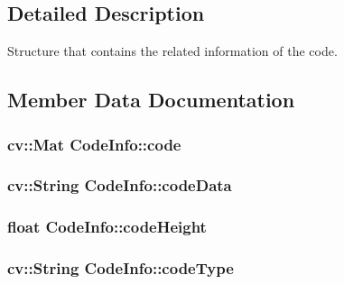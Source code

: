 \subsection{Detailed Description}
Structure that contains the related information of the code. 

\subsection{Member Data Documentation}
\subsubsection[{\texorpdfstring{code}{code}}]{\setlength{\rightskip}{0pt plus 5cm}cv\+::\+Mat Code\+Info\+::code}\hypertarget{struct_code_info_aeaec8d442ba7cf5b8a946f3da849ebfe}{}\label{struct_code_info_aeaec8d442ba7cf5b8a946f3da849ebfe}
\subsubsection[{\texorpdfstring{code\+Data}{codeData}}]{\setlength{\rightskip}{0pt plus 5cm}cv\+::\+String Code\+Info\+::code\+Data}\hypertarget{struct_code_info_a01341cc7b99f93fbdd052f6d3e5b1e20}{}\label{struct_code_info_a01341cc7b99f93fbdd052f6d3e5b1e20}
\subsubsection[{\texorpdfstring{code\+Height}{codeHeight}}]{\setlength{\rightskip}{0pt plus 5cm}float Code\+Info\+::code\+Height}\hypertarget{struct_code_info_a8035a0d0891b25d59693e23f192e3a29}{}\label{struct_code_info_a8035a0d0891b25d59693e23f192e3a29}
\subsubsection[{\texorpdfstring{code\+Type}{codeType}}]{\setlength{\rightskip}{0pt plus 5cm}cv\+::\+String Code\+Info\+::code\+Type}\hypertarget{struct_code_info_aa93c41fefb9505ee55963d60ec1299e7}{}\label{struct_code_info_aa93c41fefb9505ee55963d60ec1299e7}
